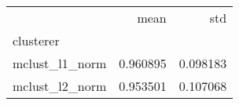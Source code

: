 \begin{tabular}{lrr}
\toprule
{} &      mean &       std \\
clusterer      &           &           \\
\midrule
mclust\_l1\_norm &  0.960895 &  0.098183 \\
mclust\_l2\_norm &  0.953501 &  0.107068 \\
\bottomrule
\end{tabular}

